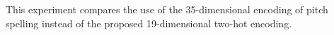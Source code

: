 
This experiment compares the use of the 35-dimensional
encoding of pitch spelling instead of the proposed
19-dimensional two-hot encoding.
